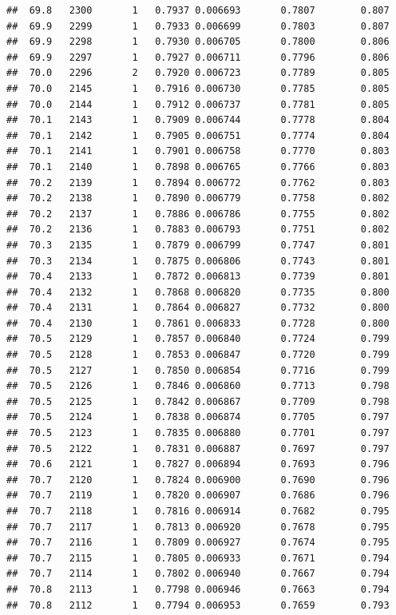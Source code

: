 \documentclass[
]{book}
\begin{document}
\begin{verbatim}
##  69.8   2300       1   0.7937 0.006693       0.7807        0.807
##  69.9   2299       1   0.7933 0.006699       0.7803        0.807
##  69.9   2298       1   0.7930 0.006705       0.7800        0.806
##  69.9   2297       1   0.7927 0.006711       0.7796        0.806
##  70.0   2296       2   0.7920 0.006723       0.7789        0.805
##  70.0   2145       1   0.7916 0.006730       0.7785        0.805
##  70.0   2144       1   0.7912 0.006737       0.7781        0.805
##  70.1   2143       1   0.7909 0.006744       0.7778        0.804
##  70.1   2142       1   0.7905 0.006751       0.7774        0.804
##  70.1   2141       1   0.7901 0.006758       0.7770        0.803
##  70.1   2140       1   0.7898 0.006765       0.7766        0.803
##  70.2   2139       1   0.7894 0.006772       0.7762        0.803
##  70.2   2138       1   0.7890 0.006779       0.7758        0.802
##  70.2   2137       1   0.7886 0.006786       0.7755        0.802
##  70.2   2136       1   0.7883 0.006793       0.7751        0.802
##  70.3   2135       1   0.7879 0.006799       0.7747        0.801
##  70.3   2134       1   0.7875 0.006806       0.7743        0.801
##  70.4   2133       1   0.7872 0.006813       0.7739        0.801
##  70.4   2132       1   0.7868 0.006820       0.7735        0.800
##  70.4   2131       1   0.7864 0.006827       0.7732        0.800
##  70.4   2130       1   0.7861 0.006833       0.7728        0.800
##  70.5   2129       1   0.7857 0.006840       0.7724        0.799
##  70.5   2128       1   0.7853 0.006847       0.7720        0.799
##  70.5   2127       1   0.7850 0.006854       0.7716        0.799
##  70.5   2126       1   0.7846 0.006860       0.7713        0.798
##  70.5   2125       1   0.7842 0.006867       0.7709        0.798
##  70.5   2124       1   0.7838 0.006874       0.7705        0.797
##  70.5   2123       1   0.7835 0.006880       0.7701        0.797
##  70.5   2122       1   0.7831 0.006887       0.7697        0.797
##  70.6   2121       1   0.7827 0.006894       0.7693        0.796
##  70.7   2120       1   0.7824 0.006900       0.7690        0.796
##  70.7   2119       1   0.7820 0.006907       0.7686        0.796
##  70.7   2118       1   0.7816 0.006914       0.7682        0.795
##  70.7   2117       1   0.7813 0.006920       0.7678        0.795
##  70.7   2116       1   0.7809 0.006927       0.7674        0.795
##  70.7   2115       1   0.7805 0.006933       0.7671        0.794
##  70.7   2114       1   0.7802 0.006940       0.7667        0.794
##  70.8   2113       1   0.7798 0.006946       0.7663        0.794
##  70.8   2112       1   0.7794 0.006953       0.7659        0.793

\end{verbatim}
\end{document}
